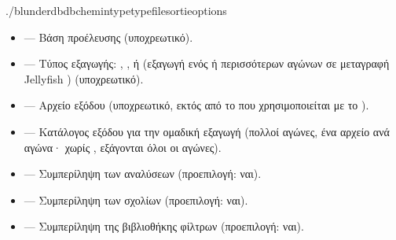 \documentclass[letterpaper,10pt,greek]{sphinxmanual}
\begin{document}
\begin{sphinxVerbatim}[commandchars=\\\{\}]
./blunderdb\PYGZhy{}\PYGZhy{}db\PYGZlt{}chemin\PYGZgt{}\PYGZhy{}\PYGZhy{}type\PYGZlt{}type\PYGZgt{}\PYGZhy{}\PYGZhy{}file\PYGZlt{}sortie\PYGZgt{}\PYG{o}{[}options\PYG{o}{]}
\end{sphinxVerbatim}

\sphinxAtStartPar
{}
\begin{itemize}
\item {} 
\sphinxAtStartPar
{} — Βάση προέλευσης (υποχρεωτικό).

\item {} 
\sphinxAtStartPar
{} — Τύπος εξαγωγής: , ,  ή  (εξαγωγή ενός ή περισσότερων αγώνων σε μεταγραφή Jellyfish ) (υποχρεωτικό).

\item {} 
\sphinxAtStartPar
{} — Αρχείο εξόδου (υποχρεωτικό, εκτός από το  που χρησιμοποιείται με το ).

\item {} 
\sphinxAtStartPar
{} — Κατάλογος εξόδου για την ομαδική εξαγωγή  (πολλοί αγώνες, ένα αρχείο ανά αγώνα· χωρίς , εξάγονται όλοι οι αγώνες).

\item {} 
\sphinxAtStartPar
{} — Συμπερίληψη των αναλύσεων (προεπιλογή: ναι).

\item {} 
\sphinxAtStartPar
{} — Συμπερίληψη των σχολίων (προεπιλογή: ναι).

\item {} 
\sphinxAtStartPar
{} — Συμπερίληψη της βιβλιοθήκης φίλτρων (προεπιλογή: ναι).


\end{itemize}
\end{document}
